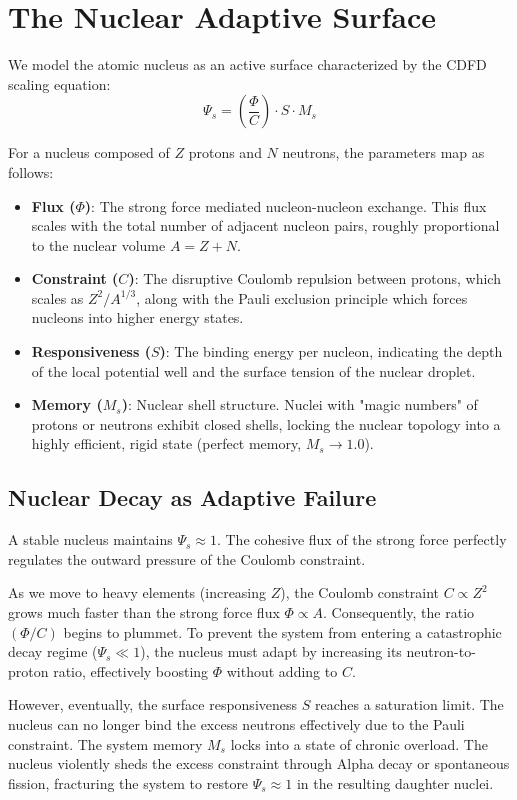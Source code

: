 \documentclass[11pt,a4paper]{article}
\begin{document}
\section{The Nuclear Adaptive Surface}
We model the atomic nucleus as an active surface characterized by the CDFD scaling equation:
\begin{equation}
    \Psi_s = \left( \frac{\Phi}{C} \right) \cdot S \cdot M_s
\end{equation}

For a nucleus composed of $Z$ protons and $N$ neutrons, the parameters map as follows:
\begin{itemize}
    \item \textbf{Flux ($\Phi$)}: The strong force mediated nucleon-nucleon exchange. This flux scales with the total number of adjacent nucleon pairs, roughly proportional to the nuclear volume $A = Z+N$.
    \item \textbf{Constraint ($C$)}: The disruptive Coulomb repulsion between protons, which scales as $Z^2 / A^{1/3}$, along with the Pauli exclusion principle which forces nucleons into higher energy states.
    \item \textbf{Responsiveness ($S$)}: The binding energy per nucleon, indicating the depth of the local potential well and the surface tension of the nuclear droplet.
    \item \textbf{Memory ($M_s$)}: Nuclear shell structure. Nuclei with "magic numbers" of protons or neutrons exhibit closed shells, locking the nuclear topology into a highly efficient, rigid state (perfect memory, $M_s \to 1.0$).
\end{itemize}

\subsection{Nuclear Decay as Adaptive Failure}
A stable nucleus maintains $\Psi_s \approx 1$. The cohesive flux of the strong force perfectly regulates the outward pressure of the Coulomb constraint.

As we move to heavy elements (increasing $Z$), the Coulomb constraint $C \propto Z^2$ grows much faster than the strong force flux $\Phi \propto A$. Consequently, the ratio $(\Phi/C)$ begins to plummet. To prevent the system from entering a catastrophic decay regime ($\Psi_s \ll 1$), the nucleus must adapt by increasing its neutron-to-proton ratio, effectively boosting $\Phi$ without adding to $C$.

However, eventually, the surface responsiveness $S$ reaches a saturation limit. The nucleus can no longer bind the excess neutrons effectively due to the Pauli constraint. The system memory $M_s$ locks into a state of chronic overload. The nucleus violently sheds the excess constraint through Alpha decay or spontaneous fission, fracturing the system to restore $\Psi_s \approx 1$ in the resulting daughter nuclei.
\end{document}
